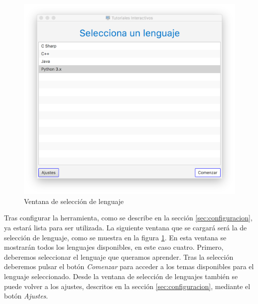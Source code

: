 \documentclass[]{article}
\begin{document}
%
\begin{figure}[tbp]
\begin{center}
\includegraphics[scale=0.35,trim={40px 40px 40px 30px},clip]{ng_1.png}
\end{center}
\caption{Ventana de selección de lenguaje\label{fig:ng_1}}
\end{figure}
%

Tras configurar la herramienta, como se describe en la sección \ref{sec:configuracion}, ya estará lista para ser utilizada. La siguiente ventana que se cargará será la de selección de lenguaje, como se muestra en la figura \ref{fig:ng_1}. En esta ventana se mostrarán todos los lenguajes disponibles, en este caso cuatro. Primero, deberemos seleccionar el lenguaje que queramos aprender. Tras la selección deberemos pulsar el botón \emph{Comenzar} para acceder a los temas disponibles para el lenguaje seleccionado. Desde la ventana de selección de lenguajes también se puede volver a los ajustes, descritos en la sección \ref{sec:configuracion}, mediante el botón \emph{Ajustes}.
\end{document}
